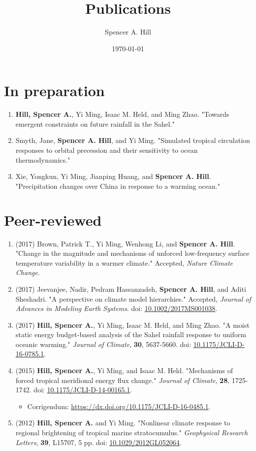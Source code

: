 \documentclass[12pt,letterpaper]{shillcv}
\author{Spencer A. Hill}
\date{\today}
\title{Publications}
\begin{document}
\maketitle
\section*{In preparation}
\label{sec:org8ca938f}
\begin{enumerate}
\item \textbf{Hill, Spencer A.}, Yi Ming, Isaac M. Held, and Ming Zhao.  "Towards emergent
constraints on future rainfall in the Sahel."
\item Smyth, Jane, \textbf{Spencer A. Hill}, and Yi Ming.  "Simulated tropical circulation
responses to orbital precession and their sensitivity to ocean
thermodynamics."
\item Xie, Yongkun, Yi Ming, Jianping Huang, and \textbf{Spencer A. Hill}.  "Precipitation
changes over China in response to a warming ocean."
\end{enumerate}
\section*{Peer-reviewed}
\label{sec:org25f1e8e}
\begin{enumerate}
\item (2017) Brown, Patrick T., Yi Ming, Wenhong Li, and \textbf{Spencer A. Hill}.  "Change
in the magnitude and mechanisms of unforced low-frequency surface temperature
variability in a warmer climate."  Accepted, \emph{Nature Climate Change}.
\item (2017) Jeevanjee, Nadir, Pedram Hassanzadeh, \textbf{Spencer A. Hill}, and Aditi
Sheshadri.  "A perspective on climate model hierarchies."  Accepted, \emph{Journal
of Advances in Modeling Earth Systems}.  doi: \href{https://doi.org/10.1002/2017MS001038}{10.1002/2017MS001038}.
\item (2017) \textbf{Hill, Spencer A.}, Yi Ming, Isaac M. Held, and Ming Zhao.  "A moist
static energy budget-based analysis of the Sahel rainfall response to uniform
oceanic warming."  \emph{Journal of Climate}, \textbf{30}, 5637-5660.  doi:
\href{https://doi.org/10.1175/JCLI-D-16-0785.1}{10.1175/JCLI-D-16-0785.1}.
\item (2015) \textbf{Hill, Spencer A.}, Yi Ming, and Isaac M. Held.  "Mechanisms of forced
tropical meridional energy flux change."  \emph{Journal of Climate}, \textbf{28}, 1725-1742.
doi: \href{http://dx.doi.org/10.1175/JCLI-D-14-00165.1}{10.1175/JCLI-D-14-00165.1}.
\begin{itemize}
\item Corrigendum: \url{https://dx.doi.org/10.1175/JCLI-D-16-0485.1}.
\end{itemize}
\item (2012) \textbf{Hill, Spencer A.} and Yi Ming.  "Nonlinear climate response to regional
brightening of tropical marine stratocumulus."  \emph{Geophysical Research Letters},
\textbf{39}, L15707, 5 pp. doi:
\href{http://dx.doi.org/10.1029/2012GL052064}{10.1029/2012GL052064}.
\end{enumerate}
\end{document}

